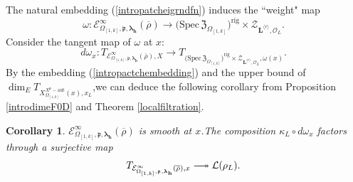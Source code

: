 \documentclass[SecEq,CM,GP]{degruyter-crelle} %
\theoremstyle{plain}
\newtheorem{cor}[thm]{Corollary}
\newcommand{\twoheadlongrightarrow}{\relbar\joinrel\twoheadrightarrow}
\newcommand{\bersteineigenvarpik}{{\mathcal{E}_{\omepik,\fp,\bm{\lambda}_\bh}^\infty(\overline{\rho})}}
\newcommand{\defvarrho}{{ X_{\omepik,\mathbf{{h}}}(\overline{r})}}
\newcommand{\lrr}{{\langle r\rangle}}
\newcommand{\omepik}{\Omega_{[1,k]}}
\newcommand{\rigch}{{\mathcal{Z}_{\bL^{\lrr},\mathcal{O}_L}}}
\newcommand{\sbanpik}{{\big(\mathrm{Spec}\hspace{2pt}\mathfrak{Z}_{\omepik}\big)^{\mathrm{rig}}}}
\newcommand{\xfpx}{X^{X^\fp-\mathrm{aut}}_{\omepik}(x)}
\newcommand{\BU}{{\mathbb{U}}}
\newcommand{\bL}{{\mathbf{L}}}
\newcommand{\bh}{{\mathbf{h}}}
\newcommand{\cE}{\mathcal E}
\newcommand{\FX}{{\mathfrak{X}}}
\newcommand{\fp}{{\mathfrak{p}}}
\newcommand{\sL}{\mathcal L}
\begin{document}


The natural embedding (\ref{intropatcheigrndfn}) induces the ``weight" map 
\begin{equation}
	\omega:	\bersteineigenvarpik \longrightarrow \sbanpik\times \rigch.\;
\end{equation}
Consider the tangent map of $\omega$ at $x$:
\begin{equation}
	d\omega_x:	T_{\bersteineigenvarpik,X} \longrightarrow T_{\sbanpik\times \rigch,\omega(x)}.\;
\end{equation}
By the embedding  (\ref{intropactchembedding}) and the upper bound of $\dim_ET_{\xfpx,x_L}$,\;we can deduce the following corollary from Proposition \ref{introdimeF0D} and Theorem \ref{localfiltration}.\;
\begin{cor}\label{introcoreigentangentmap2}$\bersteineigenvarpik$ is smooth at $x$.\;The composition $\kappa_L\circ d\omega_x$ factors through a surjective map
	\begin{equation}
		T_{\bersteineigenvarpik,x}\twoheadlongrightarrow \sL(\rho_L).\;
	\end{equation}
\end{cor}
\end{document}

